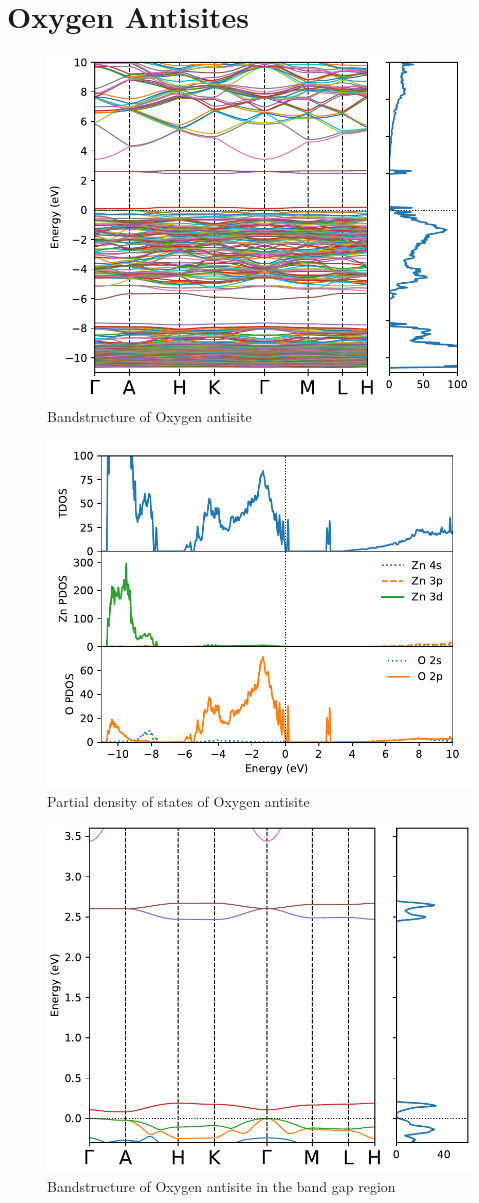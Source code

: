 \clearpage

\section{Oxygen Antisites}

\begin{figure}[tbh!]
	\centering
	\includegraphics[width=0.6\linewidth]{"images/rnd/band-dos_O_anti"}
	\caption[Bandstructure of Oxygen antisite]{Bandstructure of Oxygen antisite}
\end{figure}

\begin{figure}[tbh!]
	\centering
	\includegraphics[width=0.6\linewidth]{"images/rnd/dos-pdos_O_anti"}
	\caption[Partial density of states of Oxygen antisite]{Partial density of states of Oxygen antisite}
\end{figure}

\begin{figure}[tbh!]
	\centering
	\includegraphics[width=0.6\linewidth]{"images/rnd/band-dos-close_O_anti"}
	\caption[Bandstructure of Oxygen antisite in the band gap region]{Bandstructure of Oxygen antisite  in the band gap region}
\end{figure}

